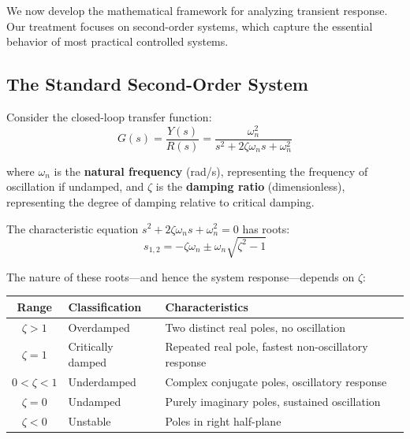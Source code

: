 We now develop the mathematical framework for analyzing transient response. Our treatment focuses on second-order systems, which capture the essential behavior of most practical controlled systems.

\subsection{The Standard Second-Order System}

Consider the closed-loop transfer function:
\begin{equation}
    G(s) = \frac{Y(s)}{R(s)} = \frac{\omega_n^2}{s^2 + 2\zeta\omega_n s + \omega_n^2}
    \label{eq:second_order_tf}
\end{equation}

where $\omega_n$ is the \textbf{natural frequency} (rad/s), representing the frequency of oscillation if undamped, and $\zeta$ is the \textbf{damping ratio} (dimensionless), representing the degree of damping relative to critical damping.

The characteristic equation $s^2 + 2\zeta\omega_n s + \omega_n^2 = 0$ has roots:
\begin{equation}
    s_{1,2} = -\zeta\omega_n \pm \omega_n\sqrt{\zeta^2 - 1}
    \label{eq:char_roots}
\end{equation}

The nature of these roots---and hence the system response---depends on $\zeta$:

\begin{keyconceptbox}
\begin{center}
\begin{tabular}{cll}
\toprule
\textbf{Range} & \textbf{Classification} & \textbf{Characteristics} \\
\midrule
$\zeta > 1$ & Overdamped & Two distinct real poles, no oscillation \\
$\zeta = 1$ & Critically damped & Repeated real pole, fastest non-oscillatory response \\
$0 < \zeta < 1$ & Underdamped & Complex conjugate poles, oscillatory response \\
$\zeta = 0$ & Undamped & Purely imaginary poles, sustained oscillation \\
$\zeta < 0$ & Unstable & Poles in right half-plane \\
\bottomrule
\end{tabular}
\end{center}
\end{keyconceptbox}


